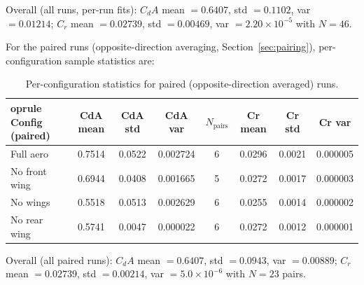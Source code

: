 \documentclass[11pt,a4paper]{article}
\begin{document}
Overall (all runs, per-run fits): \(C_dA\) mean \(=0.6407\), std \(=0.1102\), var \(=0.01214\); \(C_r\) mean \(=0.02739\), std \(=0.00469\), var \(=2.20\times10^{-5}\) with \(N=46\).

For the paired runs (opposite-direction averaging, Section~\ref{sec:pairing}), per-configuration sample statistics are:
\begin{table}[h]
  \centering
  \begin{tabular}{l S[table-format=1.4] S[table-format=1.4] S[table-format=1.6] c S[table-format=1.4] S[table-format=1.4] S[table-format=1.6]}
    	oprule
    {Config (paired)} & {CdA mean} & {CdA std} & {CdA var} & {$N_\text{pairs}$} & {Cr mean} & {Cr std} & {Cr var} \\
    \midrule
    Full aero        & 0.7514 & 0.0522 & 0.002724 & 6 & 0.0296 & 0.0021 & 0.000005 \\
    No front wing    & 0.6944 & 0.0408 & 0.001665 & 5 & 0.0272 & 0.0017 & 0.000003 \\
    No wings         & 0.5518 & 0.0513 & 0.002629 & 6 & 0.0255 & 0.0014 & 0.000002 \\
    No rear wing     & 0.5741 & 0.0047 & 0.000022 & 6 & 0.0272 & 0.0012 & 0.000001 \\
    \bottomrule
  \end{tabular}
  \caption{Per-configuration statistics for paired (opposite-direction averaged) runs.}
\end{table}

Overall (all paired runs): \(C_dA\) mean \(=0.6407\), std \(=0.0943\), var \(=0.00889\); \(C_r\) mean \(=0.02739\), std \(=0.00214\), var \(=5.0\times10^{-6}\) with \(N=23\) pairs.
\end{document}
